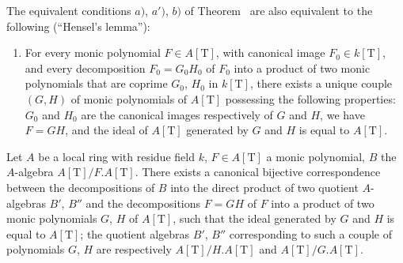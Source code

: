 \begin{remark}[18.5.13]
\label{IV.18.5.13}
The equivalent conditions $a)$, $a')$, $b)$ of Theorem~ are also equivalent to the following (``Hensel's lemma''):
\begin{enumerate}
  \item[a$''$)] For every monic polynomial $F\in A[\mathrm{T}]$, with canonical image $F_0\in k[\mathrm{T}]$, and every decomposition $F_0=G_0 H_0$ of $F_0$ into a product of two monic polynomials that are coprime $G_0$, $H_0$ in $k[\mathrm{T}]$, there exists a unique couple $(G,H)$ of monic polynomials of $A[\mathrm{T}]$ possessing the following properties:
$G_0$ and $H_0$ are the canonical images respectively of $G$ and $H$, we have $F=GH$, and the ideal of $A[\mathrm{T}]$ generated by $G$ and $H$ is equal to $A[\mathrm{T}]$.
\end{enumerate}
\end{remark}

\begin{lemma}[18.5.13.1]
\label{IV.18.5.13.1}
Let $A$ be a local ring with residue field $k$, $F\in A[\mathrm{T}]$ a monic polynomial, $B$ the $A$-algebra $A[\mathrm{T}]/F.A[\mathrm{T}]$.
There exists a canonical bijective correspondence between the decompositions of $B$ into the direct product of two quotient $A$-algebras $B'$, $B''$ and the decompositions $F=GH$ of $F$ into a product of two monic polynomials $G$, $H$ of $A[\mathrm{T}]$, such that the ideal generated by $G$ and $H$ is equal to $A[\mathrm{T}]$;
the quotient algebras $B'$, $B''$ corresponding to such a couple of polynomials $G$, $H$ are respectively $A[\mathrm{T}]/H.A[\mathrm{T}]$ and $A[\mathrm{T}]/G.A[\mathrm{T}]$.
\end{lemma}

